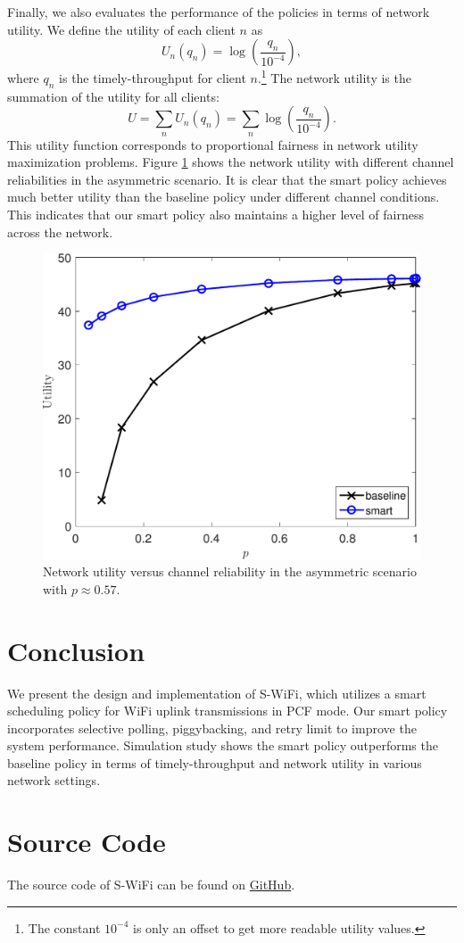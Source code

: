 \documentclass{article}
\begin{document}
Finally, we also evaluates the performance of the policies in terms of network utility. We define the utility of each client $n$ as
\[
U_n(q_n)=\log \left(\frac{q_n}{10^{-4}}\right) ,
\]
where $q_n$ is the timely-throughput for client $n$.\footnote{The constant $10^{-4}$ is only an offset to get more readable utility values.}
The network utility is the summation of the utility for all clients:
\[
U = \sum_n U_n(q_n) = \sum_n \log (\frac{q_n}{10^{-4}}) .
\]
This utility function corresponds to proportional fairness in network utility maximization problems. Figure \ref{sim: asym: utility} shows the network utility with different channel reliabilities in the asymmetric scenario. It is clear that the smart policy achieves much better utility than the baseline policy under different channel conditions. This indicates that our smart policy also maintains a higher level of fairness across the network.

\begin{figure}[htbp]
\centering
\includegraphics[scale=0.5]{U_p_asym.pdf}
\caption{Network utility versus channel reliability in the asymmetric scenario with $p\approx 0.57$.}
\label{sim: asym: utility}
\end{figure}

\section{Conclusion}

We present the design and implementation of S-WiFi, which utilizes a smart scheduling policy for WiFi uplink transmissions in PCF mode. Our smart policy incorporates selective polling, piggybacking, and retry limit to improve the system performance. Simulation study shows the smart policy outperforms the baseline policy in terms of timely-throughput and network utility in various network settings.

\appendix
\section{Source Code}
The source code of S-WiFi can be found on \href{https://github.com/S-WiFi/S-WiFi}{GitHub}.
\end{document}
